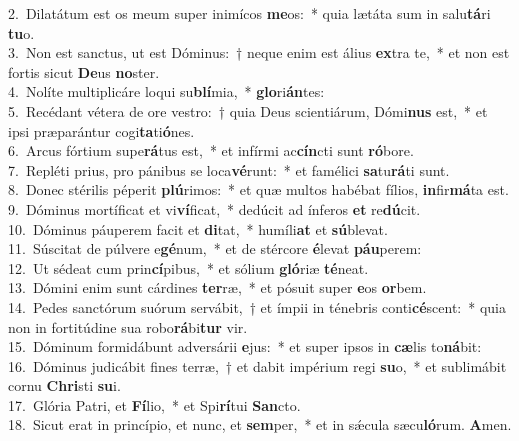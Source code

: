 {2.~}Dilatátum est os meum super inimícos \textbf{me}os:~* quia lætáta sum in salu\textbf{tá}ri \textbf{tu}o.\\
{3.~}Non est sanctus, ut est Dóminus:~† neque enim est álius \textbf{ex}tra te,~* et non est fortis sicut \textbf{De}us \textbf{no}ster.\\
{4.~}Nolíte multiplicáre loqui su\textbf{blí}mia,~* \textbf{glo}ri\textbf{án}tes:\\
{5.~}Recédant vétera de ore vestro:~† quia Deus scientiárum, Dómi\textbf{nus} est,~* et ipsi præparántur cogi\textbf{ta}ti\textbf{ó}nes.\\
{6.~}Arcus fórtium supe\textbf{rá}tus est,~* et infírmi ac\textbf{cín}cti sunt \textbf{ró}bore.\\
{7.~}Repléti prius, pro pánibus se loca\textbf{vé}runt:~* et famélici \textbf{sa}tu\textbf{rá}ti sunt.\\
{8.~}Donec stérilis péperit \textbf{plú}rimos:~* et quæ multos habébat fílios, \textbf{in}fir\textbf{má}ta est.\\
{9.~}Dóminus mortíficat et vi\textbf{ví}ficat,~* dedúcit ad ínferos \textbf{et} re\textbf{dú}cit.\\
{10.~}Dóminus páuperem facit et \textbf{di}tat,~* humíli\textbf{at} et \textbf{sú}blevat.\\
{11.~}Súscitat de púlvere e\textbf{gé}num,~* et de stércore \textbf{é}levat \textbf{páu}perem:\\
{12.~}Ut sédeat cum prin\textbf{cí}pibus,~* et sólium \textbf{gló}riæ \textbf{té}neat.\\
{13.~}Dómini enim sunt cárdines \textbf{ter}ræ,~* et pósuit super \textbf{e}os \textbf{or}bem.\\
{14.~}Pedes sanctórum suórum servábit,~† et ímpii in ténebris conti\textbf{cé}scent:~* quia non in fortitúdine sua robo\textbf{rá}bi\textbf{tur} vir.\\
{15.~}Dóminum formidábunt adversárii \textbf{e}jus:~* et super ipsos in \textbf{cæ}lis to\textbf{ná}bit:\\
{16.~}Dóminus judicábit fines terræ,~† et dabit impérium regi \textbf{su}o,~* et sublimábit cornu \textbf{Chri}sti \textbf{su}i.\\
{17.~}Glória Patri, et \textbf{Fí}lio,~* et Spi\textbf{rí}tui \textbf{San}cto.\\
{18.~}Sicut erat in princípio, et nunc, et \textbf{sem}per,~* et in sǽcula sæcu\textbf{ló}rum. \textbf{A}men.\\
